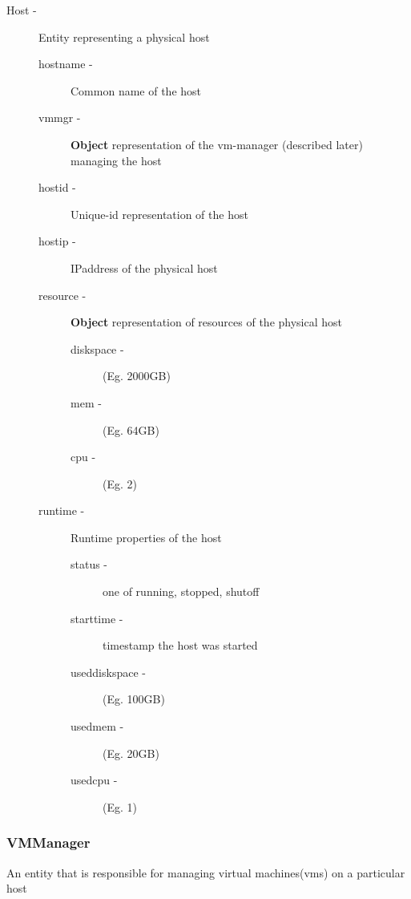 \documentclass[11pt]{article}
\begin{document}
\begin{description}
\item [Host -] Entity representing a physical host

\begin{description}
\item [hostname -] Common name of the host
\item [vmmgr -] \textbf{Object} representation of the vm-manager
                         (described later) managing the host
\item [hostid -] Unique-id representation of the host
\item [hostip -] IPaddress of the physical host
\item [resource -]  \textbf{Object} representation of resources of the physical host

\begin{description}
\item [diskspace -] (Eg. 2000GB)
\item [mem -] (Eg. 64GB)
\item [cpu -] (Eg. 2)
\end{description}

\item [runtime -] Runtime properties of the host

\begin{description}
\item [status -] one of running, stopped, shutoff
\item [starttime -] timestamp the host was started
\item [useddiskspace -] (Eg. 100GB)
\item [usedmem -] (Eg. 20GB)
\item [usedcpu -] (Eg. 1)
\end{description}

\end{description}

\end{description}
\subsubsection{VMManager}
\label{sec-3.2.5}


     An entity that is responsible for managing virtual machines(vms)
     on a particular host
\end{document}
